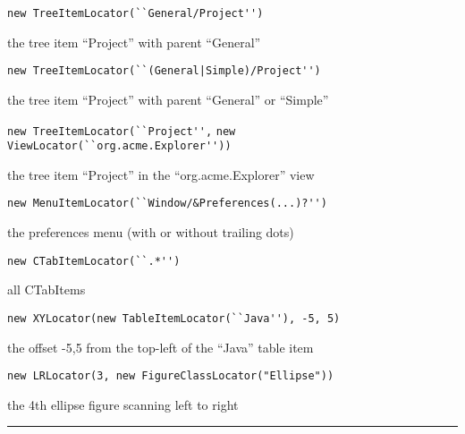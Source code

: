\documentclass[10pt, twocolumn]{article}
\newcommand{\topic}[1]{
\hRule

{\sf{\textbf{#1}}}
\vspace{0.05in}

}
\newcommand{\code}[1]{\lstinline[basicstyle=\small\ttfamily]{#1}}
\newcommand{\hRule}{\rule{\linewidth}{0.2mm}}
\newcommand{\Indent}{\hspace{0.2in}}
\newcommand{\desc}[1]{\Indent\parbox[b]{3.5in}{#1}}
\begin{document}
%
%
%
%
%
%


\code{new TreeItemLocator(``General/Project'')}

\desc{the tree item ``Project'' with parent ``General''}

\code{new TreeItemLocator(``(General|Simple)/Project'')}

\desc{the tree item ``Project'' with parent ``General'' or ``Simple''}

\code{new TreeItemLocator(``Project'',}
\indent\indent\indent\code{new ViewLocator(``org.acme.Explorer''))}

\desc{the tree item ``Project'' in the ``org.acme.Explorer'' view}

\code{new MenuItemLocator(``Window/&Preferences(...)?'')}

\desc{the preferences menu (with or without trailing dots)}

%

\code{new CTabItemLocator(``.*'')}

\desc{all CTabItems}

\code{new XYLocator(new TableItemLocator(``Java''), -5, 5)}

\desc{the offset -5,5 from the top-left of the ``Java'' table item}

\code{new LRLocator(3, new FigureClassLocator("Ellipse"))}

\desc{the 4th ellipse figure scanning left to right}



\topic{Conditions}
\end{document}

